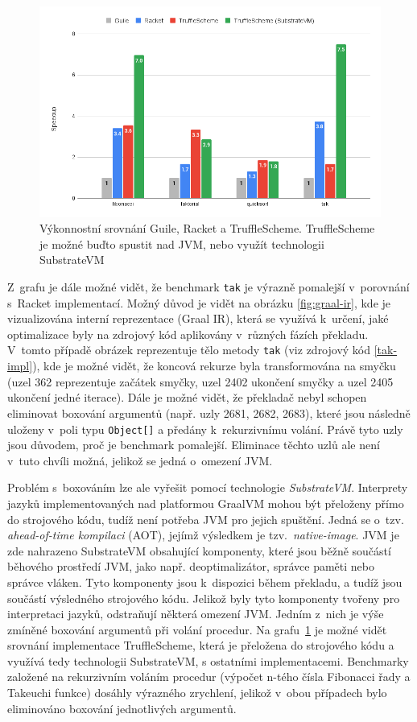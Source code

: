 \documentclass[
  master,
  biblatex,
  figures=true,
  theorems,
  sourcecodes,
  glossaries,
  index
]{kidiplom}
\begin{document}
\begin{figure} [h]
    \centering
    \includegraphics[width= 1\textwidth]{images/benchmark-grouped.png}
    \caption{Výkonnostní srovnání Guile, Racket a TruffleScheme. TruffleScheme je možné buďto spustit nad JVM, nebo využít technologii SubstrateVM}
    \label{fig:grouped-benchmark}
\end{figure}


Z~grafu je dále možné vidět, že benchmark \texttt{tak} je výrazně pomalejší v~porovnání s~Racket implementací. Možný důvod je vidět na obrázku \ref{fig:graal-ir}, kde je vizualizována interní reprezentace (Graal IR), která se využívá k~určení, jaké optimalizace byly na zdrojový kód aplikovány v~různých fázích překladu. V~tomto případě obrázek reprezentuje tělo metody \texttt{tak} (viz zdrojový kód \ref{tak-impl}), kde je možné vidět, že koncová rekurze byla transformována na smyčku (uzel 362 reprezentuje začátek smyčky, uzel 2402 ukončení smyčky a uzel 2405 ukončení jedné iterace). Dále je možné vidět, že překladač nebyl schopen eliminovat boxování argumentů (např. uzly 2681, 2682, 2683), které jsou následně uloženy v~poli typu \texttt{Object[]} a předány k~rekurzivnímu volání. Právě tyto uzly jsou důvodem, proč je benchmark pomalejší. Eliminace těchto uzlů ale není v~tuto chvíli možná, jelikož se jedná o~omezení JVM. 


Problém s~boxováním lze ale vyřešit pomocí technologie \textit{SubstrateVM}. Interprety jazyků implementovaných nad platformou GraalVM mohou být přeloženy přímo do strojového kódu, tudíž není potřeba JVM pro jejich spuštění. Jedná se o~tzv. \textit{ahead-of-time kompilaci} (AOT), jejímž výsledkem je tzv.~\textit{native-image}. JVM je zde nahrazeno SubstrateVM obsahující komponenty, které jsou běžně součástí běhového prostředí JVM, jako např. deoptimalizátor, správce paměti nebo správce vláken. Tyto komponenty jsou k~dispozici během překladu, a tudíž jsou součástí výsledného strojového kódu. Jelikož byly tyto komponenty tvořeny pro interpretaci jazyků, odstraňují některá omezení JVM. Jedním z~nich je výše zmíněné boxování argumentů při volání procedur. Na grafu~\ref{fig:grouped-benchmark} je možné vidět srovnání implementace TruffleScheme, která je přeložena do strojového kódu a využívá tedy technologii SubstrateVM, s ostatními implementacemi. Benchmarky založené na rekurzivním voláním procedur (výpočet n-tého čísla Fibonacci řady a Takeuchi funkce) dosáhly výrazného zrychlení, jelikož v~obou případech bylo eliminováno boxování jednotlivých argumentů.  
\end{document}
